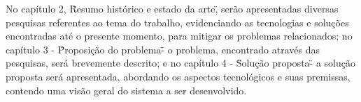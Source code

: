 No capítulo 2, \"Resumo histórico e estado da arte\", serão apresentadas diversas pesquisas 
referentes ao tema do trabalho, evidenciando as tecnologias e soluções encontradas até o 
presente momento, para mitigar os problemas relacionados; no capítulo 3 - \"Proposição do 
problema\" - o problema, encontrado através das pesquisas, será brevemente descrito; e no 
capítulo 4 - \"Solução proposta\" - a solução proposta será apresentada, abordando os 
aspectos tecnológicos e suas premissas, contendo uma visão geral do sistema a ser 
desenvolvido.